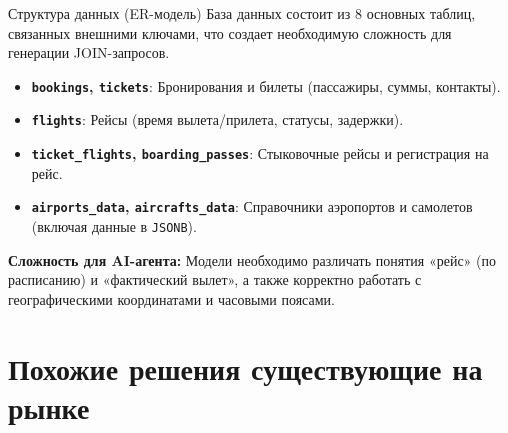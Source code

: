 \documentclass[10pt, aspectratio=169, unicode]{beamer}
\begin{document}
\begin{frame}{Структура данных (ER-модель)}
    База данных состоит из 8 основных таблиц, связанных внешними ключами, что создает необходимую сложность для генерации JOIN-запросов.
    
    \vspace{0.3cm}
    \small
    \begin{itemize}
        \item \textbf{\texttt{bookings}, \texttt{tickets}}: Бронирования и билеты (пассажиры, суммы, контакты).
        \item \textbf{\texttt{flights}}: Рейсы (время вылета/прилета, статусы, задержки).
        \item \textbf{\texttt{ticket\_flights}, \texttt{boarding\_passes}}: Стыковочные рейсы и регистрация на рейс.
        \item \textbf{\texttt{airports\_data}, \texttt{aircrafts\_data}}: Справочники аэропортов и самолетов (включая данные в \texttt{JSONB}).
    \end{itemize}
    
    \vspace{0.3cm}
    \textbf{Сложность для AI-агента:}
    Модели необходимо различать понятия «рейс» (по расписанию) и «фактический вылет», а также корректно работать с географическими координатами и часовыми поясами.
\end{frame}



\section{Похожие решения существующие на рынке}
\end{document}
